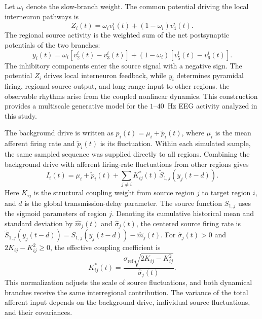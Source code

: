 \documentclass{article}
\begin{document}
Let $\omega_i$ denote the slow-branch weight. The common potential driving the local interneuron pathways is
\begin{equation}
Z_i(t)=\omega_i v_1^i(t)+(1-\omega_i)v_4^i(t).
\tag{2.2}\label{eq:neurodyn-local-feedback}
\end{equation}
The regional source activity is the weighted sum of the net postsynaptic potentials of the two branches:
\begin{equation}
y_i(t)=\omega_i\left[v_2^i(t)-v_3^i(t)\right]
+(1-\omega_i)\left[v_5^i(t)-v_6^i(t)\right].
\tag{2.3}\label{eq:neurodyn-source-output}
\end{equation}
The inhibitory components enter the source signal with a negative sign. The potential $Z_i$ drives local interneuron feedback, while $y_i$ determines pyramidal firing, regional source output, and long-range input to other regions. the observable rhythms arise from the coupled nonlinear dynamics. This construction provides a multiscale generative model for the $1$--$40$~Hz EEG activity analyzed in this study. 

The background drive is written as $p_i(t)=\mu_i+\widetilde p_i(t)$, where $\mu_i$ is the mean afferent firing rate and $\widetilde p_i(t)$ is its fluctuation. Within each simulated sample, the same sampled sequence was supplied directly to all regions. Combining the background drive with afferent firing-rate fluctuations from other regions gives
\begin{equation}
I_i(t)=\mu_i+\widetilde p_i(t)
+\sum_{j\ne i}K_{ij}^{*}(t)\,
\widetilde S_{1,j}\!\left(y_j(t-d)\right).
\tag{2.4}\label{eq:neurodyn-total-input}
\end{equation}
Here $K_{ij}$ is the structural coupling weight from source region $j$ to target region $i$, and $d$ is the global transmission-delay parameter. The source function $S_{1,j}$ uses the sigmoid parameters of region $j$. Denoting its cumulative historical mean and standard deviation by $\widehat m_j(t)$ and $\widehat\sigma_j(t)$, the centered source firing rate is $\widetilde S_{1,j}(y_j(t-d))=S_{1,j}(y_j(t-d))-\widehat m_j(t)$. For $\widehat\sigma_j(t)>0$ and $2K_{ij}-K_{ij}^2\geq0$, the effective coupling coefficient is
\begin{equation}
K_{ij}^{*}(t)=
\frac{\sigma_{\mathrm{ref}}\sqrt{2K_{ij}-K_{ij}^{2}}}
{\widehat\sigma_j(t)}.
\tag{2.5}\label{eq:neurodyn-effective-coupling}
\end{equation}
This normalization adjusts the scale of source fluctuations, and both dynamical branches receive the same interregional contribution. The variance of the total afferent input depends on the background drive, individual source fluctuations, and their covariances.
\end{document}
